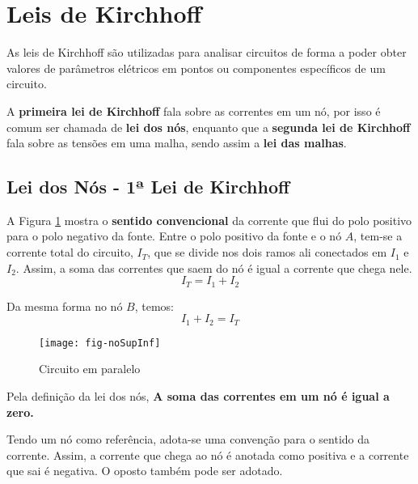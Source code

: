 \section{Leis de Kirchhoff}

As leis de Kirchhoff são utilizadas para analisar circuitos de forma a poder obter valores de parâmetros elétricos em pontos ou componentes específicos de um circuito.

A \textbf{primeira lei de Kirchhoff} fala sobre as correntes em um nó, por isso é comum ser chamada de \textbf{lei dos nós}, enquanto que a \textbf{segunda lei de Kirchhoff} fala sobre as tensões em uma malha, sendo assim a \textbf{lei das malhas}.





\subsection{Lei dos Nós - 1ª Lei de Kirchhoff}

A Figura \ref{fig:nosAeB} mostra o \textbf{sentido convencional} da corrente que flui do polo positivo para o polo negativo da fonte.
Entre o polo positivo da fonte e o nó $A$, tem-se a corrente total do circuito, $I_T$, que se divide nos dois ramos ali conectados em $I_1$ e $I_2$. Assim, a soma das correntes que saem do nó é igual a corrente que chega nele.
\begin{equation}
I_T = I_1 + I_2
\end{equation}

Da mesma forma no nó $B$, temos:
\begin{equation}
I_1 + I_2	= I_T
\end{equation}

\begin{figure}[!h]
	\centering
	\caption{Circuito em paralelo}
	\texttt{[image: fig-noSupInf]}
	\label{fig:nosAeB}
\end{figure}

Pela definição da lei dos nós,
\textbf{A soma das correntes em um nó é igual a zero.}

Tendo um nó como referência, adota-se uma convenção para o sentido da corrente. Assim, a corrente que chega ao nó é anotada como positiva e a corrente que sai é negativa. O oposto também pode ser adotado.

